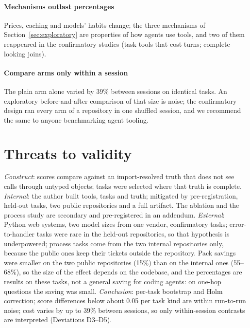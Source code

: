 \documentclass[conference]{IEEEtran}
\begin{document}
\paragraph{Mechanisms outlast percentages} Prices, caching and models' habits change; the three mechanisms of
Section~\ref{sec:exploratory} are properties of how agents use tools, and two of them reappeared in the confirmatory
studies (task tools that cost turns; complete-looking joins).
\paragraph{Compare arms only within a session} The plain arm alone varied by 39\% between sessions on identical tasks.
An exploratory before-and-after comparison of that size is noise; the confirmatory design ran every arm of a
repository in one shuffled session, and we recommend the same to anyone benchmarking agent tooling.

\section{Threats to validity}
\emph{Construct}: scores compare against an import-resolved truth that does not see calls through untyped objects;
tasks were selected where that truth is complete. \emph{Internal}: the author built tools, tasks and truth; mitigated by
pre-registration, held-out tasks, two public repositories and a full artifact. The ablation and the process study are
secondary and pre-registered in an addendum. \emph{External}: Python web systems, two model sizes from one vendor,
\confTasks{} confirmatory tasks; error-to-handler tasks were rare in the held-out repositories, so that hypothesis is
underpowered; process tasks come from the two internal repositories only, because the public ones keep their tickets
outside the repository. Pack savings were smaller on the two public repositories (15\%) than on the internal ones
(55--68\%), so the size of the effect depends on the codebase, and the percentages are results on these tasks, not a
general saving for coding agents: on one-hop questions the saving was small. \emph{Conclusion}: per-task bootstrap and Holm
correction; score differences below about 0.05 per task kind are within run-to-run noise; cost varies by up to 39\%
between sessions, so only within-session contrasts are interpreted (Deviations D3--D5).
\end{document}
